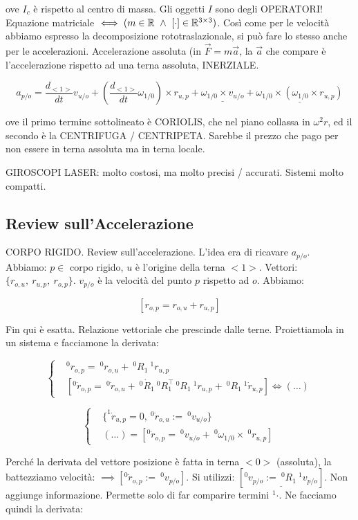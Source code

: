 ove $I_c$ è rispetto al centro di massa. Gli oggetti $I$ sono degli OPERATORI! Equazione matriciale $\iff (m\in\R\ \land\ [\mathord{\cdot}]\in\R^{3\times 3})$. Così come per le velocità abbiamo espresso la decomposizione rototraslazionale, si può fare lo stesso anche per le accelerazioni. Accelerazione assoluta (in $\vec{F}=m\vec{a}$, la $\vec{a}$ che compare è l'accelerazione rispetto ad una terna assoluta, INERZIALE.

\[
	a_{p/o} = \frac{d_{<1>}}{dt}v_{u/o} + (\frac{d_{<1>}}{dt} \omega_{1/0})\times r_{u,p} + \underline{\omega_{1/0}\times v_{u/o}} + \underline{\omega_{1/0}\times (\omega_{1/0}\times r_{u,p})}
\]

ove il primo termine sottolineato è CORIOLIS, che nel piano collassa in $\omega^2r$, ed il secondo è la CENTRIFUGA / CENTRIPETA. Sarebbe il prezzo che pago per non essere in terna assoluta ma in terna locale. 

GIROSCOPI LASER: molto costosi, ma molto precisi / accurati. Sistemi molto compatti.

\subsection{Review sull'Accelerazione}

CORPO RIGIDO. Review sull'accelerazione. L'idea era di ricavare $a_{p/o}$. Abbiamo: $p\in$ corpo rigido, $u$ è l'origine della terna $<1>$. Vettori: $\{r_{o,u},\ r_{u,p},\ r_{o,p}\}$. $v_{p/o}$ è la velocità del punto $p$ rispetto ad $o$. Abbiamo:

\[
	[r_{o,p} = r_{o,u} + r_{u,p}]
\]

Fin qui è esatta. Relazione vettoriale che prescinde dalle terne. Proiettiamola in un sistema e facciamone la derivata:

\[
	\left\{
	\begin{aligned}
	&^0r_{o,p} =\ ^0r_{o,u} +\ ^0R_1\ ^1r_{u,p}\\
	&[^0\dot{r}_{o,p} =\ ^0\dot{r}_{o,u} +\ ^0\dot{R}_1\ ^0R_1^\top\ ^0R_1\ ^1r_{u,p} +\ ^0R_1\ ^1\dot{r}_{u,p}] \iff (\dots)
	\end{aligned}
	\right.
\]

\[
	\left\{
	\begin{aligned}
	&\{^1\dot{r}_{u,p} = 0,\ ^0\dot{r}_{o,u} :=\ ^0v_{u/o}\}\\
	&(\dots) = [^0\dot{r}_{o,p} =\ ^0v_{u/o} +\ ^0\omega_{1/0}\times\ ^0r_{u,p}]
	\end{aligned}
	\right.
\]

Perché la derivata del vettore posizione è fatta in terna $<0>$ (assoluta), la battezziamo velocità: $\implies [^0\dot{r}_{o,p} :=\ ^0v_{p/o}]$. Si utilizzi: $[\underline{^0v_{p/o} :=\ ^0R_1\ ^1v_{p/o}}]$. Non aggiunge informazione. Permette solo di far comparire termini $^1\mathord{\cdot}$. Ne facciamo quindi la derivata:

